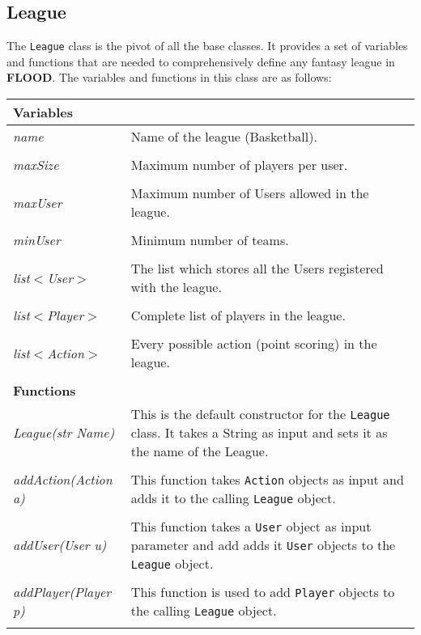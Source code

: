 \documentclass[12pt]{report}
\begin{document}
\subsection{League}
\begin{doublespace}
The \texttt{League} class is the pivot of all the base classes. It provides a set of variables and functions that are needed to comprehensively define any fantasy league in \textbf{FLOOD}. The variables and functions in this class are as follows:

\begin{flushleft}
\begin{onehalfspace}
\begin{tabular}{ l | p{12cm} }
\hline
\textbf{Variables} & \\
\hline
\textit{name} & Name of the league (Basketball). \\
\\
\textit{maxSize} & Maximum number of players per user. \\
\\
\textit{maxUser} & Maximum number of Users allowed in the league. \\
\\
\textit{minUser} & Minimum number of teams. \\
\\
\textit{list$<$User$>$} & The list which stores all the Users registered with the league. \\
\\
\textit{list$<$Player$>$} & Complete list of players in the league. \\
\\
\textit{list$<$Action$>$} & Every possible action (point scoring) in the league. \\
\\
\hline
\textbf{Functions} & \\
\hline
\textit{League(str Name)} & This is the default constructor for the \texttt{League} class. It takes a String  as input and sets it as the name of the League. \\
\\
\textit{addAction(Action a)} & This function takes \texttt{Action} objects as input and adds it to the calling \texttt{League} object. \\	
\\
\textit{addUser(User u)} & This function takes a \texttt{User} object as input parameter and add adds it \texttt{User} objects to the \texttt{League} object. \\
\\
\textit{addPlayer(Player p)} & This function is used to add \texttt{Player} objects to the calling \texttt{League} object. \\
\\
\end{tabular}
\end{onehalfspace}
\end{flushleft}


\end{doublespace}
\end{document}
